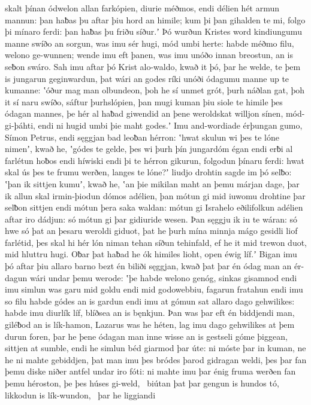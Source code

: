 skalt þínan ódwelon allan farkópien,
diurie méðmos, endi délien hét
armun mannun: þan haƀas þu aftar þiu
hord an himile; kum þi þan gihalden te mi,
folgo þi mínaro ferdi: þan haƀas þu friðu síður.ʼ
Þó wurðun Kristes word kindiungumu manne
swíðo an sorgun, was imu sér hugi,
mód umbi herte: habde méðmo filu,
welono ge-wunnen; wende imu eft þanen,
was imu unóðo innan breostun,
an is seƀon swáro. Sah imu aftar þó
Krist alo-waldo, kwað it þó, þar he welde,
te þem is jungarun geginwardun, þat wári an godes ríki
unóði ódagumu manne up te kumanne:
ʽóður mag man olbundeon, þoh he sí unmet grót,
þurh náðlan gat, þoh it sí naru swíðo,
sáftur þurhslópien, þan mugi kuman þiu siole te himile
þes ódagan mannes, þe hér al haƀad
giwendid an þene weroldskat willjon sínen,
mód-gi-þáhti, endi ni hugid umbi þie maht godes.ʼ
Imu and-wordiade érþungan gumo,
Símon Petrus, endi sęggjan bad
leoƀan hérron: ʽhwat skulun wi þes te lóne nimenʼ, kwað he,
ʽgódes te gelde, þes wi þurh þín jungardóm
égan endi erƀi al farlétun
hoƀos endi híwiski endi þi te hérron gikurun,
folgodun þínaru ferdi: hwat skal ús þes te frumu werðen,
langes te lóne?ʼ liudjo drohtin
sagde im þó selƀo: ʽþan ik sittjen kumuʼ, kwað he,
ʽan þie mikilan maht an þemu márjan dage,
þar ik allun skal irmin-þiodun
dómos adélien, þan mótun gi mid iuwomu drohtine þar
selƀon sittjen endi mótun þera saka waldan:
mótun gi Israhelo eðilifolkun
adélien aftar iro dádjun: só mótun gi þar gidiuride wesen.
Þan sęggju ik iu te wáran: só hwe só þat an þesaru weroldi giduot,
þat he þurh mína minnja mágo gesidli
liof farlétid, þes skal hi hér lón niman
tehan síðun tehinfald, ef he it mid trewon duot,
mid hluttru hugi. Oƀar þat haƀad he ók himiles lioht,
open éwig líf.ʼ Bigan imu þó aftar þiu
allaro barno bezt én biliði sęggjan,
kwað þat þar én ódag man an ér-dagun
wári undar þemu werode: ʽþe habde welono genóg,
sinkas gisamnod endi imu simlun was
garu mid goldu endi mid godowebbiu,
fagarun fratahun endi imu so filu habde
gódes an is gardun endi imu at gómun sat
allaro dago gehwilikes: habde imu diurlík líf,
blíðsea an is bęnkjun. Þan was þar eft én biddjendi man,
giléƀod an is lík-hamon, Lazarus was he héten,
lag imu dago gehwilikes at þem durun foren,
þar he þene ódagan man inne wisse
an is gestseli góme þiggean,
sittjen at sumble, endi he simlun béd
giarmod þar úte: ni móste þar in kuman,
ne he ni mahte gebiddjen, þat man imu þes bródes þarod
gidragan weldi, þes þar fan þemu diske niðer
antfel undar iro fóti: ni mahte imu þar énig fruma werðen
fan þemu héroston, þe þes húses gi-weld, \hld\ biútan þat þar gengun is hundos tó,
likkodun is lík-wundon, \hld\ þar he liggiandi
